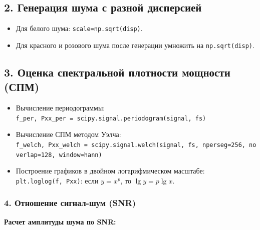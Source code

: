 \documentclass[12pt,a4paper,openany]{book}
\providecommand{\tightlist}{\setlength{\itemsep}{0pt}\setlength{\parskip}{0pt}}
\begin{document}
\subsection*{2. Генерация шума с разной дисперсией}

\begin{itemize}
\tightlist
\item
  Для белого шума: \texttt{scale=\allowbreak{}np.\allowbreak{}sqrt(\allowbreak{}disp)}.
\item
  Для красного и розового шума после генерации умножить на \texttt{np.\allowbreak{}sqrt(\allowbreak{}disp)}.
\end{itemize}

\subsection*{3. Оценка спектральной плотности мощности (СПМ)}

\begin{itemize}
\tightlist
\item
  Вычисление периодограммы: \texttt{f\_\allowbreak{}per,\allowbreak{}\ Pxx\_\allowbreak{}per\ =\allowbreak{}\ scipy.\allowbreak{}signal.\allowbreak{}periodogram(\allowbreak{}signal,\allowbreak{}\ fs)}
\item
  Вычисление СПМ методом Уэлча: \texttt{f\_\allowbreak{}welch,\allowbreak{}\ Pxx\_\allowbreak{}welch\ =\allowbreak{}\ scipy.\allowbreak{}signal.\allowbreak{}welch(\allowbreak{}signal,\allowbreak{}\ fs,\allowbreak{}\ nperseg=\allowbreak{}256,\allowbreak{}\ noverlap=\allowbreak{}128,\allowbreak{}\ window=\allowbreak{}\textquotesingle{}\allowbreak{}hann\textquotesingle{}\allowbreak{})}
\item
  Построение графиков в двойном логарифмическом масштабе: \texttt{plt.\allowbreak{}loglog(\allowbreak{}f,\allowbreak{}\ Pxx)}:
  если \(y=x^p\), то \(\lg y = p\lg x\).
\end{itemize}

\subsubsection*{4. Отношение сигнал-шум (SNR)}

\textbf{Расчет амплитуды шума по SNR:}
\end{document}
